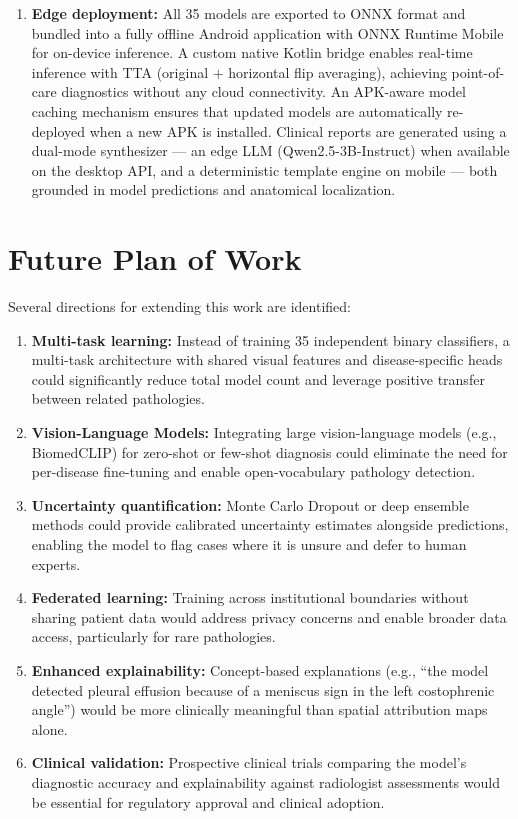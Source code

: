 \documentclass[12pt,a4paper]{report}
\begin{document}
\begin{enumerate}
    \item \textbf{Edge deployment:} All 35 models are exported to ONNX format and bundled into a fully offline Android application with ONNX Runtime Mobile for on-device inference. A custom native Kotlin bridge enables real-time inference with TTA (original $+$ horizontal flip averaging), achieving point-of-care diagnostics without any cloud connectivity. An APK-aware model caching mechanism ensures that updated models are automatically re-deployed when a new APK is installed. Clinical reports are generated using a dual-mode synthesizer --- an edge LLM (Qwen2.5-3B-Instruct) when available on the desktop API, and a deterministic template engine on mobile --- both grounded in model predictions and anatomical localization.
\end{enumerate}

\section{Future Plan of Work}

Several directions for extending this work are identified:

\begin{enumerate}
    \item \textbf{Multi-task learning:} Instead of training 35 independent binary classifiers, a multi-task architecture with shared visual features and disease-specific heads could significantly reduce total model count and leverage positive transfer between related pathologies.
    
    \item \textbf{Vision-Language Models:} Integrating large vision-language models (e.g., BiomedCLIP) for zero-shot or few-shot diagnosis could eliminate the need for per-disease fine-tuning and enable open-vocabulary pathology detection.
    
    \item \textbf{Uncertainty quantification:} Monte Carlo Dropout or deep ensemble methods could provide calibrated uncertainty estimates alongside predictions, enabling the model to flag cases where it is unsure and defer to human experts.
    
    \item \textbf{Federated learning:} Training across institutional boundaries without sharing patient data would address privacy concerns and enable broader data access, particularly for rare pathologies.
    
    \item \textbf{Enhanced explainability:} Concept-based explanations (e.g., ``the model detected pleural effusion because of a meniscus sign in the left costophrenic angle'') would be more clinically meaningful than spatial attribution maps alone.
    
    \item \textbf{Clinical validation:} Prospective clinical trials comparing the model's diagnostic accuracy and explainability against radiologist assessments would be essential for regulatory approval and clinical adoption.
\end{enumerate}
\end{document}
